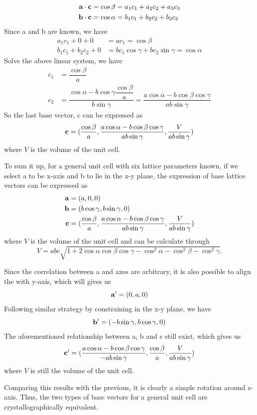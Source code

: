 \documentclass[12pt]{scrartcl}
\begin{document}
\begin{align*}
	\mathbf{a} \cdot \mathbf{c} &= \cos\beta   = a_1c_1 + a_2c_2 + a_3c_3 \\
	\mathbf{b} \cdot \mathbf{c} &= \cos\alpha = b_1c_1 + b_2c_2 + b_3c_3	
\end{align*}
Since \vctr a and \vctr b are known, we have
\begin{align*}
	a_1c_1 + 0 + 0 &= ac_1 = \cos\beta \\
	b_1c_1 + b_2c_2 + 0 &= bc_1\cos\gamma  + bc_2\sin\gamma  = \cos\alpha
\end{align*}
Solve the above linear system, we have
\begin{align*}
	c_1 &= \dfrac{\cos\beta}{a} \\
	c_2 &= \dfrac{\cos\alpha - b\cos\gamma\dfrac{\cos\beta}{a}}{b\sin\gamma} 
	         = \dfrac{a\cos\alpha - b\cos\beta\cos\gamma}{ab\sin\gamma}
\end{align*}
So the last base vector, \vctr c can be expressed as 
\[
	\mathbf{c} = (\dfrac{\cos\beta}{a}, \dfrac{a\cos\alpha - b\cos\beta\cos\gamma}{ab\sin\gamma},  \dfrac{V}{ab\sin\gamma})
\]
where $V$ is the volume of the unit cell.

To sum it up, for a general unit cell with six lattice parameters known, if we select \vctr a to be x-axis and \vctr b to lie in the x-y plane, the expression of base lattice vectors can be expressed as 
\begin{align*}
	\mathbf{a} &= (a, 0, 0) \\
	\mathbf{b} &= (b\cos\gamma, b\sin\gamma, 0) \\
	\mathbf{c} &=  (\dfrac{\cos\beta}{a}, \dfrac{a\cos\alpha - b\cos\beta\cos\gamma}{ab\sin\gamma},  \dfrac{V}{ab\sin\gamma})
\end{align*}
where $V$ is the volume of the unit cell and can be calculate through
\[
	V = abc\sqrt{1 + 2\cos\alpha\cos\beta\cos\gamma - \cos^2\alpha-\cos^2\beta-\cos^2\gamma}.
\]

Since the correlation between \vctr a and axes are arbitrary, it is also possible to align the \vctr with y-axis, which will gives us
\[
	\mathbf{a}' = (0, a, 0)
\]
Following similar strategy by constraining \vctr in the x-y plane, we have
\[
	\mathbf{b}' = (-b\sin\gamma, b\cos\gamma, 0)
\]
The aforementioned relationship between \vctr a, \vctr b and \vctr c still exist, which gives us
\[
	\mathbf{c}' =(\dfrac{a\cos\alpha - b\cos\beta\cos\gamma}{-ab\sin\gamma}, \dfrac{\cos\beta}{a}, \dfrac{V}{ab\sin\gamma})
\] 
where $V$ is still the volume of the unit cell. 

Comparing this results with the previous, it is clearly a simple rotation around z-axis.
Thus, the two types of base vectors for a general unit cell are crystallographically equivalent. 
\end{document}
